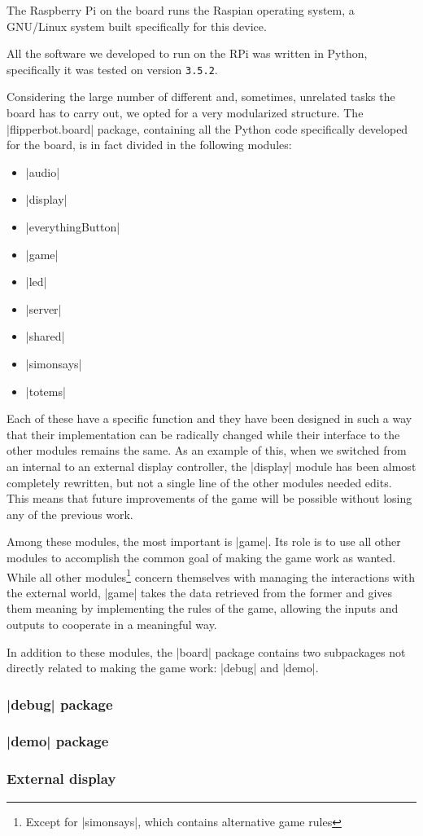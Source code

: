 The Raspberry Pi on the board runs the Raspian operating system, a GNU/Linux
system built specifically for this device.

All the software we developed to run on the RPi was written in Python,
specifically it was tested on version \Verb|3.5.2|.

\beforelist* Considering the large number of different and, sometimes, unrelated
tasks the board has to carry out, we opted for a very modularized structure.
The \Code|flipperbot.board| package, containing all the Python code specifically
developed for the board, is in fact divided in the following modules:
\begin{multicols}{2}
\begin{itemize}
  \item \Code|audio|
  \item \Code|display|
  \item \Code|everythingButton|
  \item \Code|game|
  \item \Code|led|
  \item \Code|server|
  \item \Code|shared|
  \item \Code|simonsays|
  \item \Code|totems|
\end{itemize}
\end{multicols}
\afterlist*
Each of these have a specific function and they have been designed in such a way
that their implementation can be radically changed while their interface to the
other modules remains the same.
As an example of this, when we switched from an internal to an external display controller, the \Code|display| module has been almost completely rewritten, but
not a single line of the other modules needed edits.
This means that future improvements of the game will be possible without losing
any of the previous work.

Among these modules, the most important is \Code|game|.
Its role is to use all other modules to accomplish the common goal of making the
game work as wanted.
While all other modules\footnote{Except for \Code|simonsays|, which contains alternative game rules} concern themselves with managing the interactions with
the external world, \Code|game| takes the data retrieved from the former and
gives them meaning by implementing the rules of the game, allowing the inputs
and outputs to cooperate in a meaningful way.

In addition to these modules, the \Code|board| package contains two subpackages
not directly related to making the game work: \Code|debug| and \Code|demo|. 

\subsubsection[\code{demo} package]{\Code|debug| package}


\subsubsection[\code{demo} package]{\Code|demo| package}


\subsubsection{External display}

